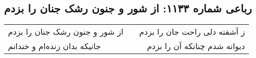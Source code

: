 \begin{center}
\section*{رباعی شماره ۱۱۳۳: از شور و جنون رشک جنان را بزدم}
\label{sec:1133}
\begin{longtable}{l p{0.5cm} r}
از شور و جنون رشک جنان را بزدم
&&
ز آشفته دلی راحت جان را بزدم
\\
جانیکه بدان زنده‌ام و خندانم
&&
دیوانه شدم چنانکه آن را بزدم
\\
\end{longtable}
\end{center}
